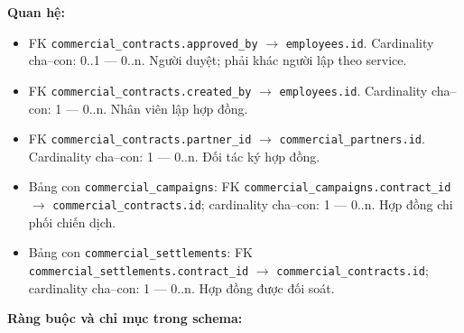 \textbf{Quan hệ:}

\begin{itemize}

\item FK \texttt{commercial\_contracts.approved\_by} $\rightarrow$ \texttt{employees.id}. Cardinality cha--con: 0..1 — 0..n. Người duyệt; phải khác người lập theo service.

\item FK \texttt{commercial\_contracts.created\_by} $\rightarrow$ \texttt{employees.id}. Cardinality cha--con: 1 — 0..n. Nhân viên lập hợp đồng.

\item FK \texttt{commercial\_contracts.partner\_id} $\rightarrow$ \texttt{commercial\_partners.id}. Cardinality cha--con: 1 — 0..n. Đối tác ký hợp đồng.

\item Bảng con \texttt{commercial\_campaigns}: FK \texttt{commercial\_campaigns.contract\_id} $\rightarrow$ \texttt{commercial\_contracts.id}; cardinality cha--con: 1 — 0..n. Hợp đồng chi phối chiến dịch.

\item Bảng con \texttt{commercial\_settlements}: FK \texttt{commercial\_settlements.contract\_id} $\rightarrow$ \texttt{commercial\_contracts.id}; cardinality cha--con: 1 — 0..n. Hợp đồng được đối soát.

\end{itemize}

\textbf{Ràng buộc và chỉ mục trong schema:}

